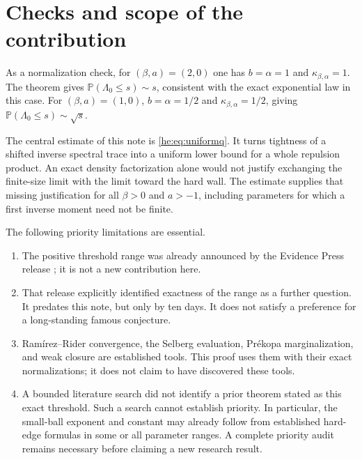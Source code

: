 \documentclass[11pt,a4paper]{article}
\theoremstyle{definition}
\theoremstyle{remark}
\newcommand{\PP}{\mathbb P}
\begin{document}
\section{Checks and scope of the contribution}

As a normalization check, for $(\beta,a)=(2,0)$ one has
$b=\alpha=1$ and $\kappa_{\beta,\alpha}=1$.
The theorem gives $\PP(\Lambda_0\leq s)\sim s$, consistent with the
exact exponential law in this case.  For $(\beta,a)=(1,0)$,
$b=\alpha=1/2$ and $\kappa_{\beta,\alpha}=1/2$, giving
$\PP(\Lambda_0\leq s)\sim\sqrt{s}$.

The central estimate of this note is \eqref{he:eq:uniformq}.  It
turns tightness of a shifted inverse spectral trace into a uniform
lower bound for a whole repulsion product.  An exact density
factorization alone would not justify exchanging the finite-size
limit with the limit toward the hard wall.  The estimate supplies
that missing justification for all $\beta>0$ and $a>-1$, including
parameters for which a first inverse moment need not be finite.

The following priority limitations are essential.
\begin{enumerate}
 \item The positive threshold range was already announced by the
 Evidence Press release \cite{heEP}; it is not a new contribution here.
 \item That release explicitly identified exactness of the range
 as a further question.  It predates this note, but only by ten
 days.  It does not satisfy a preference for a long-standing
 famous conjecture.
 \item Ram\'irez--Rider convergence, the Selberg evaluation,
 Pr\'ekopa marginalization, and weak closure are established tools.
 This proof uses them with their exact normalizations; it does not
 claim to have discovered these tools.
 \item A bounded literature search did not identify a prior theorem
 stated as this exact threshold.  Such a search cannot establish
 priority.  In particular, the small-ball exponent and constant
 may already follow from established hard-edge formulas in some
 or all parameter ranges.  A complete priority audit remains
 necessary before claiming a new research result.
\end{enumerate}
\end{document}
